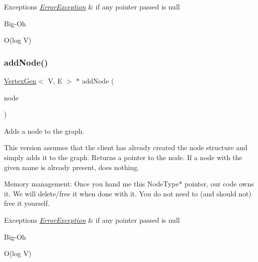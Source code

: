 \begin{DoxyExceptions}{Exceptions}
{\em \mbox{\hyperlink{classErrorException}{Error\+Exception}}} & if any pointer passed is null \\
\hline
\end{DoxyExceptions}
\begin{DoxyRefDesc}{Big-\/\+Oh}
\item[\mbox{\hyperlink{BigOh__BigOh000045}{Big-\/\+Oh}}]O(log V) \end{DoxyRefDesc}
\mbox{\label{classGraph_a635fa78d72315816cef6c091acfa3882}} 
\subsubsection{\texorpdfstring{add\+Node()}{addNode()}\hspace{0.1cm}{\footnotesize\ttfamily [2/2]}}
{\footnotesize\ttfamily \mbox{\hyperlink{classVertexGen}{Vertex\+Gen}}$<$ V, E $>$  $\ast$ add\+Node (\begin{DoxyParamCaption}\item[{\mbox{\hyperlink{classVertexGen}{Vertex\+Gen}}$<$ V, E $>$  $\ast$}]{node }\end{DoxyParamCaption})\hspace{0.3cm}{\ttfamily [inherited]}}



Adds a node to the graph. 

This version assumes that the client has already created the node structure and simply adds it to the graph. Returns a pointer to the node. If a node with the given name is already present, does nothing.

Memory management\+: Once you hand me this Node\+Type$\ast$ pointer, our code owns it. We will delete/free it when done with it. You do not need to (and should not) free it yourself.


\begin{DoxyExceptions}{Exceptions}
{\em \mbox{\hyperlink{classErrorException}{Error\+Exception}}} & if any pointer passed is null \\
\hline
\end{DoxyExceptions}
\begin{DoxyRefDesc}{Big-\/\+Oh}
\item[\mbox{\hyperlink{BigOh__BigOh000046}{Big-\/\+Oh}}]O(log V) \end{DoxyRefDesc}
\mbox{\label{classBasicGraphGen_a60f19882208c6d1dc51b74d5f348f458}} 
